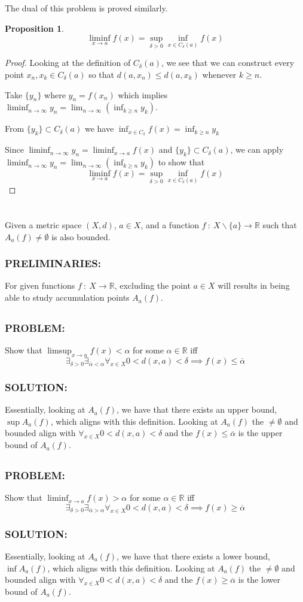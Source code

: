 \documentclass[]{article}
\newcommand{\Problem}{\subsubsection*{\textbf{PROBLEM:}}}
\newcommand{\Solution}{\subsubsection*{\textbf{SOLUTION:}}}
\newcommand{\Preliminaries}{\subsubsection*{\textbf{PRELIMINARIES:}}}
\newcommand{\R}{\mathbb{R}}
\newcommand{\st}{\ : \ }
\newtheorem{proposition}{Proposition}
\begin{document}
The dual of this problem is proved similarly.
\begin{proposition}
    \[\liminf_{x \to a} f(x) = \sup_{\delta > 0} \inf_{x \in C_\delta(a)} f(x)\]
\end{proposition}
\begin{proof}
    Looking at the definition of $C_\delta(a)$, we see that we can construct every point $x_n,x_k \in C_\delta(a)$ so that $d(a, x_{n}) \leq d(a,x_{k})$ whenever $k \geq n$.

    Take $\{y_n\}$ where $y_n = f(x_n)$ which implies $\liminf_{n\to\infty} y_n = \lim_{n\to\infty} (\inf_{k\geq n} y_k)$.
    
    From $\{y_k\} \subset C_\delta(a)$ we have $\inf_{x \in C_\delta} f(x) = \inf_{k\geq n} y_k$

    Since $\liminf_{n\to\infty} y_n = \liminf_{x \to a} f(x)$ and $\{y_k\} \subset C_\delta(a)$, we can apply $\liminf_{n\to\infty} y_n = \lim_{n\to\infty} (\inf_{k\geq n} y_k)$ to show that \[\liminf_{x \to a} f(x) = \sup_{\delta > 0} \inf_{x \in C_\delta(a)} f(x)\]
\end{proof}


\newpage
\section{}
Given a metric space $(X,d)$, $a \in X$, and a function $f \st X \backslash \{a\} \to \R$ such that $A_a(f) \neq \emptyset$ is also bounded. 

\Preliminaries
For given functions $f \st X \to \R$, excluding the point $a \in X$ will results in being able to study accumulation points $A_a(f)$.

\subsection{}
\Problem
Show that $\limsup_{x \to a} f(x) < \alpha$ for some $\alpha \in \R$ iff \[
    \exists_{\delta>0} \exists_{\overline{\alpha}< \alpha} \forall_{x \in X} 0 < d(x,a) < \delta \implies f(x) \leq \overline{\alpha}
\]
\Solution
Essentially, looking at $A_a(f)$, we have that there exists an upper bound, $\sup A_a(f)$, which aligns with this definition.
Looking at $A_a(f)$ the $\neq \emptyset$ and bounded align with $\forall_{x \in X} 0 < d(x,a) < \delta$ and the $f(x) \leq \overline{\alpha}$ is the upper bound of $A_a(f)$.

\subsection{}
\Problem
Show that $\liminf_{x \to a} f(x) > \alpha$ for some $\alpha \in \R$ iff \[
    \exists_{\delta>0} \exists_{\overline{\alpha} > \alpha} \forall_{x \in X} 0 < d(x,a) < \delta \implies f(x) \geq \overline{\alpha}
\]
\Solution
Essentially, looking at $A_a(f)$, we have that there exists a lower bound, $\inf A_a(f)$, which aligns with this definition.
Looking at $A_a(f)$ the $\neq \emptyset$ and bounded align with $\forall_{x \in X} 0 < d(x,a) < \delta$ and the $f(x) \geq \overline{\alpha}$ is the lower bound of $A_a(f)$.
\end{document}
